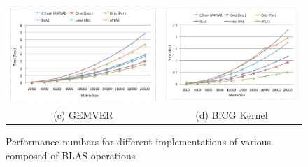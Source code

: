 \documentclass[runningheads]{llncs}
\begin{document}
\begin{figure}[htp]
{\begin{tabular}{cc}
\begin{minipage}[b]{.515\textwidth}
\includegraphics[width=\textwidth]{figures/gemver.eps}
\end{minipage}
&
\begin{minipage}[b]{.515\textwidth}
\includegraphics[width=\textwidth]{figures/bicgkernel.eps}
\end{minipage}\\

(c) GEMVER & (d) BiCG Kernel \\

\end{tabular}
}
\caption{Performance numbers for different implementations of various composed of BLAS operations}
\label{fig:results}
\end{figure}
\end{document}
